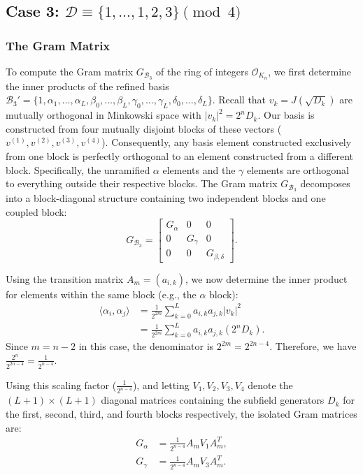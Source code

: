 \documentclass{amsart}
\theoremstyle{plain}
\theoremstyle{definition}
\theoremstyle{remark}
\numberwithin{equation}{section}
\begin{document}
\subsection{Case 3: \texorpdfstring{$\mathcal{D} \equiv \{1, \ldots, 1, 2, 3\} \pmod 4$}{Case 3}}


\subsubsection*{The Gram Matrix}

To compute the Gram matrix $G_{\mathcal{B}_3}$ of the ring of integers $\mathcal{O}_{K_n}$, we first determine the inner products of the refined basis $\mathcal{B}_3' = \{1, \alpha_1, \ldots, \alpha_L, \beta_0, \ldots, \beta_L, \gamma_0, \ldots, \gamma_L, \delta_0, \ldots, \delta_L\}$. Recall that $v_k = J(\sqrt{D_k})$ are mutually orthogonal in Minkowski space with  $|v_k|^2 = 2^n D_k$. Our basis is constructed from four mutually disjoint blocks of these vectors ($v^{(1)}, v^{(2)}, v^{(3)}, v^{(4)}$). Consequently, any basis element constructed exclusively from one block is perfectly orthogonal to an element constructed from a different block. Specifically, the unramified $\alpha$ elements and the $\gamma$ elements are orthogonal to everything outside their respective blocks. The Gram matrix $G_{\mathcal{B}_3}$ decomposes into a block-diagonal structure containing two independent blocks and one coupled block:
\[
    G_{\mathcal{B}_3} = 
    \begin{bmatrix} 
        G_\alpha & 0 & 0 \\ 
        0 & G_\gamma & 0 \\ 
        0 & 0 & G_{\beta, \delta} 
    \end{bmatrix}.
\]

 Using the transition matrix $A_m = (a_{i,k})$, we now determine the inner product for elements within the same block (e.g., the $\alpha$ block):
\begin{align*}
    \langle \alpha_i, \alpha_j \rangle &= \frac{1}{2^{2m}} \sum_{k=0}^L a_{i,k} a_{j,k} |v_k|^2 \\
    &= \frac{1}{2^{2m}} \sum_{k=0}^L a_{i,k} a_{j,k} (2^n D_k).
\end{align*}
Since $m = n - 2$ in this case, the denominator is $2^{2m} = 2^{2n - 4}$. Therefore, we have $\frac{2^n}{2^{2n-4}} = \frac{1}{2^{n-4}}$. 

Using this scaling factor ($\frac{1}{2^{n-4}}$), and letting $V_1, V_2, V_3, V_4$ denote the $(L+1) \times (L+1)$ diagonal matrices containing the subfield generators $D_k$ for the first, second, third, and fourth blocks respectively, the isolated Gram matrices are:
\begin{align*}
    G_\alpha &= \frac{1}{2^{n-4}} A_m V_1 A_m^T, \\
    G_\gamma &= \frac{1}{2^{n-4}} A_m V_3 A_m^T.
\end{align*}
\end{document}
